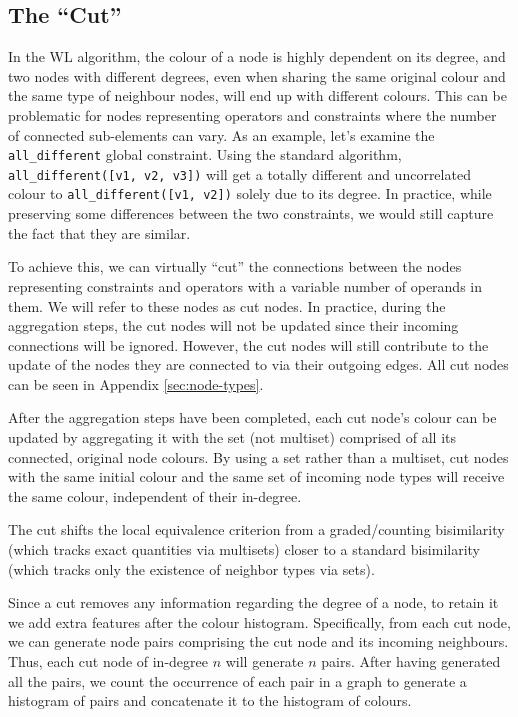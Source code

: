 \subsection{The ``Cut''}
In the WL algorithm, the colour of a node is highly dependent on its degree, and two nodes with different degrees, even when sharing the same original colour and the same type of neighbour nodes, will end up with different colours. This can be problematic for nodes representing operators and constraints where the number of connected sub-elements can vary. As an example, let's examine the \texttt{all\_different} global constraint. Using the standard algorithm, \texttt{all\_different([v1, v2, v3])} will get a totally different and uncorrelated colour to \texttt{all\_different([v1, v2])} solely due to its degree. In practice, while preserving some differences between the two constraints, we would still capture the fact that they are similar.

To achieve this, we can virtually ``cut'' the connections between the nodes representing constraints and operators with a variable number of operands in them. We will refer to these nodes as cut nodes. In practice, during the aggregation steps, the cut nodes will not be updated since their incoming connections will be ignored. However, the cut nodes will still contribute to the update of the nodes they are connected to via their outgoing edges. All cut nodes can be seen in Appendix \ref{sec:node-types}. 

After the aggregation steps have been completed, each cut node's colour can be updated by aggregating it with the set (not multiset) comprised of all its connected, original node colours. By using a set rather than a multiset, cut nodes with the same initial colour and the same set of incoming node types will receive the same colour, independent of their in-degree.

The cut shifts the local equivalence criterion from a graded/counting bisimilarity (which tracks exact quantities via multisets) closer to a standard bisimilarity (which tracks only the existence of neighbor types via sets).


Since a cut removes any information regarding the degree of a node, to retain it we add extra features after the colour histogram. Specifically, from each cut node, we can generate node pairs comprising the cut node and its incoming neighbours. Thus, each cut node of in-degree $n$ will generate $n$ pairs. After having generated all the pairs, we count the occurrence of each pair in a graph to generate a histogram of pairs and concatenate it to the histogram of colours.


